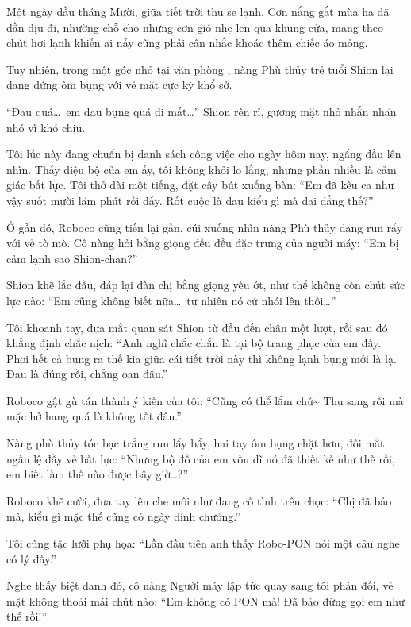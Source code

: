 \documentclass[../main.tex]{subfiles}
\begin{document}
Một ngày đầu tháng Mười, giữa tiết trời thu se lạnh. Cơn nắng gắt mùa hạ đã dần dịu đi, nhường chỗ cho những cơn gió nhẹ len qua khung cửa, mang theo chút hơi lạnh khiến ai nấy cũng phải cân nhắc khoác thêm chiếc áo mỏng.

Tuy nhiên, trong một góc nhỏ tại văn phòng \hll, nàng Phù thủy trẻ tuổi Shion lại đang đứng ôm bụng với vẻ mặt cực kỳ khổ sở.

``Đau quá\dots\ em đau bụng quá đi mất\dots'' Shion rên rỉ, gương mặt nhỏ nhắn nhăn nhó vì khó chịu.

Tôi lúc này đang chuẩn bị danh sách công việc cho ngày hôm nay, ngẩng đầu lên nhìn. Thấy điệu bộ của em ấy, tôi không khỏi lo lắng, nhưng phần nhiều là cảm giác bất lực. Tôi thở dài một tiếng, đặt cây bút xuống bàn: ``Em đã kêu ca như vậy suốt mười lăm phút rồi đấy. Rốt cuộc là đau kiểu gì mà dai dẳng thế?''


Ở gần đó, Roboco cũng tiến lại gần, cúi xuống nhìn nàng Phù thủy đang run rẩy với vẻ tò mò. Cô nàng hỏi bằng giọng đều đều đặc trưng của người máy: ``Em bị cảm lạnh sao Shion-chan?''

Shion khẽ lắc đầu, đáp lại đàn chị bằng giọng yếu ớt, như thể không còn chút sức lực nào: ``Em cũng không biết nữa\dots\ tự nhiên nó cứ nhói lên thôi\dots''

Tôi khoanh tay, đưa mắt quan sát Shion từ đầu đến chân một lượt, rồi sau đó khẳng định chắc nịch: ``Anh nghĩ chắc chắn là tại bộ trang phục của em đấy. Phơi hết cả bụng ra thế kia giữa cái tiết trời này thì không lạnh bụng mới là lạ. Đau là đúng rồi, chẳng oan đâu.''

Roboco gật gù tán thành ý kiến của tôi: ``Cũng có thể lắm chứ\~{} Thu sang rồi mà mặc hở hang quá là không tốt đâu.''

Nàng phù thủy tóc bạc trắng run lẩy bẩy, hai tay ôm bụng chặt hơn, đôi mắt ngấn lệ đầy vẻ bất lực: ``Nhưng bộ đồ của em vốn dĩ nó đã thiết kế như thế rồi, em biết làm thế nào được bây giờ\dots?''

Roboco khẽ cười, đưa tay lên che môi như đang cố tình trêu chọc: ``Chị đã bảo mà, kiểu gì mặc thế cũng có ngày dính chưởng.''

Tôi cũng tặc lưỡi phụ họa: ``Lần đầu tiên anh thấy Robo-PON nói một câu nghe có lý đấy.''

Nghe thấy biệt danh đó, cô nàng Người máy lập tức quay sang tôi phản đối, vẻ mặt không thoải mái chút nào: ``Em không có PON mà! Đã bảo đừng gọi em như thế rồi!''
\end{document}
